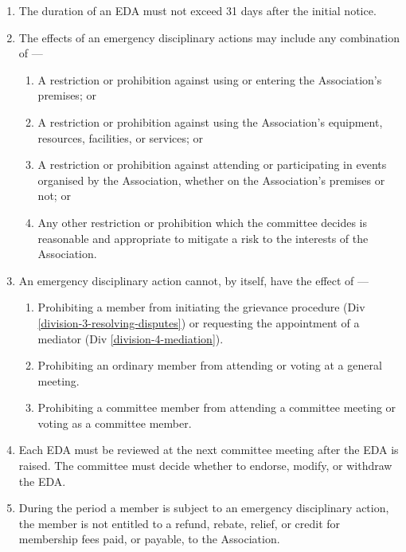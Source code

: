\documentclass[../constitution.tex]{subfiles}
\begin{document}
\begin{enumerate}
\item The duration of an EDA must not exceed 31 days after the initial notice.

\item The effects of an emergency disciplinary actions may include any combination of ---

  \begin{enumerate}
  \item A restriction or prohibition against using or entering the Association's premises; or
  \item A restriction or prohibition against using the Association's equipment, resources, facilities, or services; or
  \item A restriction or prohibition against attending or participating in events organised by the Association, whether on the Association's premises or not; or
  \item Any other restriction or prohibition which the committee decides is reasonable and appropriate to mitigate a risk to the interests of the Association.
  \end{enumerate}

\item An emergency disciplinary action cannot, by itself, have the effect of ---

  \begin{enumerate}
  \item Prohibiting a member from initiating the grievance procedure (Div \ref{division-3-resolving-disputes}) or requesting the appointment of a mediator (Div \ref{division-4-mediation}).
  \item Prohibiting an ordinary member from attending or voting at a general meeting.
  \item Prohibiting a committee member from attending a committee meeting or voting as a committee member.
  \end{enumerate}

\item Each EDA must be reviewed at the next committee meeting after the EDA is raised. The committee must decide whether to endorse, modify, or withdraw the EDA.

\item During the period a member is subject to an emergency disciplinary action, the member is not entitled to a refund, rebate, relief, or credit for membership fees paid, or payable, to the Association.

\end{enumerate}
\end{document}
